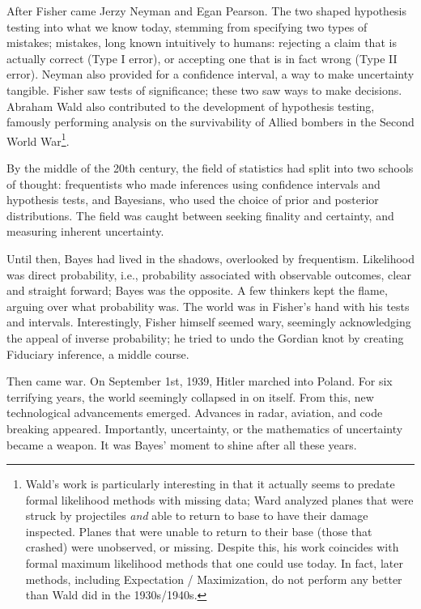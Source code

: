 After Fisher came Jerzy Neyman and Egan Pearson.  
The two shaped hypothesis testing into what we know today, stemming from specifying two types of mistakes; mistakes, 
long known intuitively to humans: rejecting a claim that is actually correct (Type I error), or accepting one that is in fact wrong (Type II error).  
Neyman also provided for a confidence interval, a way to make uncertainty tangible.  
Fisher saw tests of significance; these two saw ways to make decisions.  
Abraham Wald also contributed to the development of hypothesis testing, famously performing analysis on the survivability of 
Allied bombers in the Second World War\footnote{Wald's work is particularly interesting in that it actually seems to predate formal likelihood methods with missing data; Ward analyzed planes that were struck by projectiles \emph{and} able to return to base to have their damage inspected.  Planes that were unable to return to their base (those that crashed) were unobserved, or missing.  
Despite this, his work coincides with formal maximum likelihood methods that one could use today.  
In fact, later methods, including Expectation / Maximization, do not perform any better than Wald did in the 1930s/1940s.}\cite{mangel_abraham_1984}. 

By the middle of the 20th century, the field of statistics had split into two schools of thought: frequentists who made inferences using confidence intervals and hypothesis tests, and Bayesians, who used the choice of prior and posterior distributions.  
The field was caught between seeking finality and certainty, and measuring inherent uncertainty.  

Until then, Bayes had lived in the shadows, overlooked by frequentism.  
Likelihood was direct probability, i.e., probability associated with observable outcomes, clear and straight forward; Bayes was the opposite.  
A few thinkers kept the flame, arguing over what probability was\cite{fienberg_when_2006}.  
The world was in Fisher's hand with his tests and intervals.  
Interestingly, Fisher himself seemed wary, seemingly acknowledging the appeal of inverse probability; he tried to undo the Gordian knot by creating Fiduciary inference, a middle course\cite{pederson_fiducial_1978}. 

Then came war.  On September 1st, 1939, Hitler marched into Poland.  
For six terrifying years, the world seemingly collapsed in on itself.  From this, new technological advancements emerged.  
Advances in radar, aviation, and code breaking appeared\cite{fienberg_when_2006}.  
Importantly, uncertainty, or the mathematics of uncertainty became a weapon.  
It was Bayes' moment to shine after all these years.  

